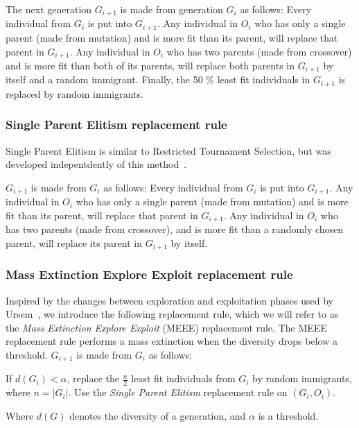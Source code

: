 The next generation $G_{i+1}$ is made from generation $G_i$ as follows:
Every individual from $G_i$ is put into $G_{i+1}$.
Any individual in $O_i$ who has only a single parent (made from mutation) and is more fit than its parent, will replace that parent in $G_{i+1}$.
Any individual in $O_i$ who has two parents (made from crossover) and is more fit than both of its parents, will replace both parents in $G_{i+1}$ by itself and a random immigrant.
Finally, the 50 \% least fit individuals in $G_{i+1}$ is replaced by random immigrants.


\subsubsection{Single Parent Elitism replacement rule}
Single Parent Elitism is similar to Restricted Tournament Selection, but was developed indepentdently of this method~\cite[p. 132]{Luke2013Metaheuristics}.

$G_{i+1}$ is made from $G_i$ as follows:
Every individual from $G_i$ is put into $G_{i+1}$.
Any individual in $O_i$ who has only a single parent (made from mutation) and is more fit than its parent, will replace that parent in $G_{i+1}$.
Any individual in $O_i$ who has two parents (made from crossover), and is more fit than a randomly chosen parent, will replace its parent in $G_{i+1}$ by itself.

\subsubsection{Mass Extinction Explore Exploit replacement rule}
Inspired by the changes between exploration and exploitation phases used by Ursem~\cite{ursem2002diversity}, we introduce the following replacement rule, which we will refer to as the \emph{Mass Extinction Explore Exploit} (MEEE) replacement rule.
The MEEE replacement rule performs a mass extinction when the diversity drops below a threshold.
$G_{i+1}$ is made from $G_i$ as follows:

If $d(G_i) < \alpha$, replace the $\frac{n}{2}$ least fit individuals from $G_i$ by random immigrants, where $n = \lvert G_i \rvert$.
Use the \emph{Single Parent Elitism} replacement rule on $(G_i, O_i)$.

Where $d(G)$ denotes the diversity of a generation, and $\alpha$ is a threshold. 


